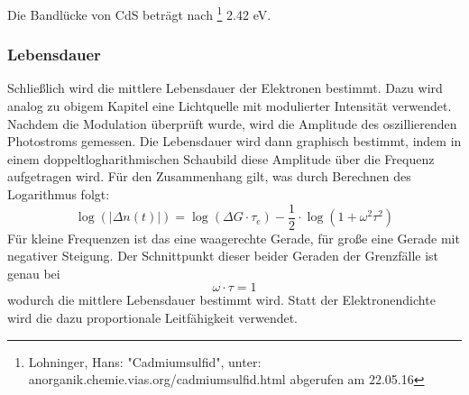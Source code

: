 Die Bandlücke von CdS beträgt nach \footnote{Lohninger, Hans: "Cadmiumsulfid", unter: anorganik.chemie.vias.org/cadmiumsulfid.html abgerufen am 22.05.16} 2.42 eV.


\subsubsection{Lebensdauer}
Schließlich wird die mittlere Lebensdauer der Elektronen bestimmt. Dazu wird analog zu obigem Kapitel eine Lichtquelle mit modulierter Intensität verwendet. \\
Nachdem die Modulation überprüft wurde, wird die Amplitude des oszillierenden Photostroms gemessen. Die Lebensdauer wird dann graphisch bestimmt, indem in einem doppeltlogharithmischen Schaubild diese Amplitude über die Frequenz aufgetragen wird. Für den Zusammenhang gilt, was durch Berechnen des Logarithmus folgt:
$$\log (\vert \Delta n(t) \vert) = \log (\Delta G \cdot \tau_e) - \frac{1}{2} \cdot \log (1 + \omega^{2} \tau^{2}) $$
Für kleine Frequenzen ist das eine waagerechte Gerade, für große eine Gerade mit negativer Steigung. Der Schnittpunkt dieser beider Geraden der Grenzfälle ist genau bei
$$\omega \cdot \tau = 1$$
wodurch die mittlere Lebensdauer bestimmt wird. Statt der Elektronendichte wird die dazu proportionale Leitfähigkeit verwendet.

